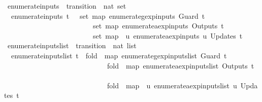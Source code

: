 \begin{isabellebody}
\isanewline
{}\isamarkupfalse%
\ enumerate{\isacharunderscore}inputs\ {\isacharcolon}{\isacharcolon}\ {\isachardoublequoteopen}transition\ {\isasymRightarrow}\ nat\ set{\isachardoublequoteclose}\ \isanewline
\ \ {\isachardoublequoteopen}enumerate{\isacharunderscore}inputs\ t\ {\isacharequal}\ {\isacharparenleft}{\isasymUnion}\ set\ {\isacharparenleft}map\ enumerate{\isacharunderscore}gexp{\isacharunderscore}inputs\ {\isacharparenleft}Guard\ t{\isacharparenright}{\isacharparenright}{\isacharparenright}\ {\isasymunion}\isanewline
\ \ \ \ \ \ \ \ \ \ \ \ \ \ \ \ \ \ \ \ \ \ \ \ {\isacharparenleft}{\isasymUnion}\ set\ {\isacharparenleft}map\ enumerate{\isacharunderscore}aexp{\isacharunderscore}inputs\ {\isacharparenleft}Outputs\ t{\isacharparenright}{\isacharparenright}{\isacharparenright}\ {\isasymunion}\isanewline
\ \ \ \ \ \ \ \ \ \ \ \ \ \ \ \ \ \ \ \ \ \ \ \ {\isacharparenleft}{\isasymUnion}\ set\ {\isacharparenleft}map\ {\isacharparenleft}{\isasymlambda}{\isacharparenleft}{\isacharunderscore}{\isacharcomma}\ u{\isacharparenright}{\isachardot}\ enumerate{\isacharunderscore}aexp{\isacharunderscore}inputs\ u{\isacharparenright}\ {\isacharparenleft}Updates\ t{\isacharparenright}{\isacharparenright}{\isacharparenright}{\isachardoublequoteclose}\isanewline
\isanewline
{}\isamarkupfalse%
\ enumerate{\isacharunderscore}inputs{\isacharunderscore}list\ {\isacharcolon}{\isacharcolon}\ {\isachardoublequoteopen}transition\ {\isasymRightarrow}\ nat\ list{\isachardoublequoteclose}\ \isanewline
\ \ {\isachardoublequoteopen}enumerate{\isacharunderscore}inputs{\isacharunderscore}list\ t\ {\isacharequal}\ {\isacharparenleft}fold\ {\isacharparenleft}{\isacharat}{\isacharparenright}\ {\isacharparenleft}map\ enumerate{\isacharunderscore}gexp{\isacharunderscore}inputs{\isacharunderscore}list\ {\isacharparenleft}Guard\ t{\isacharparenright}{\isacharparenright}\ {\isacharbrackleft}{\isacharbrackright}{\isacharparenright}\ {\isacharat}\isanewline
\ \ \ \ \ \ \ \ \ \ \ \ \ \ \ \ \ \ \ \ \ \ \ \ \ \ \ \ \ {\isacharparenleft}fold\ {\isacharparenleft}{\isacharat}{\isacharparenright}\ {\isacharparenleft}map\ enumerate{\isacharunderscore}aexp{\isacharunderscore}inputs{\isacharunderscore}list\ {\isacharparenleft}Outputs\ t{\isacharparenright}{\isacharparenright}\ {\isacharbrackleft}{\isacharbrackright}{\isacharparenright}\ {\isacharat}\isanewline
\ \ \ \ \ \ \ \ \ \ \ \ \ \ \ \ \ \ \ \ \ \ \ \ \ \ \ \ \ {\isacharparenleft}fold\ {\isacharparenleft}{\isacharat}{\isacharparenright}\ {\isacharparenleft}map\ {\isacharparenleft}{\isasymlambda}{\isacharparenleft}{\isacharunderscore}{\isacharcomma}\ u{\isacharparenright}{\isachardot}\ enumerate{\isacharunderscore}aexp{\isacharunderscore}inputs{\isacharunderscore}list\ u{\isacharparenright}\ {\isacharparenleft}Updates\ t{\isacharparenright}{\isacharparenright}\ {\isacharbrackleft}{\isacharbrackright}{\isacharparenright}{\isachardoublequoteclose}\isanewline

\end{isabellebody}
